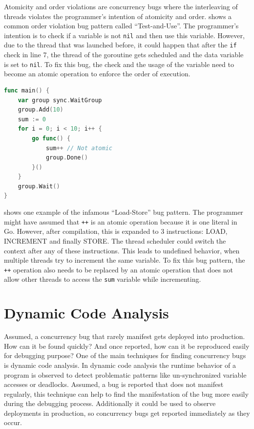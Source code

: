 \documentclass[conference]{IEEEtran}
\begin{document}
Atomicity and order violations are concurrency bugs where the interleaving of threads violates the programmer's intention of atomicity and order.
 shows a common order violation bug pattern called ``Test-and-Use''.
The programmer's intention is to check if a variable is not \lstinline{nil} and then use this variable.
However, due to the thread that was launched before, it could happen that after the \lstinline{if} check in line 7, the thread of the goroutine gets scheduled and the data variable is set to \lstinline{nil}.
To fix this bug, the check and the usage of the variable need to become an atomic operation to enforce the order of execution.

\begin{lstlisting}[float=h, language=Go, label=lst:atomicity, caption=Load-Store bug pattern -- Atomicity violation]
func main() {
    var group sync.WaitGroup
    group.Add(10)
    sum := 0
    for i = 0; i < 10; i++ {
        go func() {
            sum++ // Not atomic
            group.Done()
        }()
    }
    group.Wait()
}
\end{lstlisting}

 shows one example of the infamous ``Load-Store'' bug pattern.
The programmer might have assumed that \lstinline{++} is an atomic operation because it is one literal in Go.
However, after compilation, this is expanded to 3 instructions: LOAD, INCREMENT and finally STORE.
The thread scheduler could switch the context after any of these instructions.
This leads to undefined behavior, when multiple threads try to increment the same variable.
To fix this bug pattern, the \lstinline{++} operation also needs to be replaced by an atomic operation that does not allow other threads to access the \lstinline{sum} variable while incrementing.


\section{Dynamic Code Analysis}
\label{sct:dynamic}

Assumed, a concurrency bug that rarely manifest gets deployed into production.
How can it be found quickly?
And once reported, how can it be reproduced easily for debugging purpose?
One of the main techniques for finding concurrency bugs is dynamic code analysis.
In dynamic code analysis the runtime behavior of a program is observed to detect problematic patterns like un-synchronized variable accesses or deadlocks.
Assumed, a bug is reported that does not manifest regularly, this technique can help to find the manifestation of the bug more easily during the debugging process.
Additionally it could be used to observe deployments in production, so concurrency bugs get reported immediately as they occur.
\end{document}
